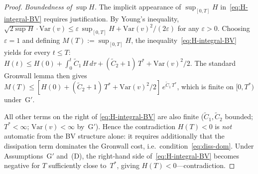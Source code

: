 \documentclass[12pt,a4paper]{article}
\theoremstyle{definition}
\theoremstyle{plain}
\theoremstyle{remark}
\begin{document}
\begin{proof}
\emph{Boundedness of $\sup H$.}\;
The implicit appearance of $\sup_{[0,T]} H$ in~\eqref{eq:H-integral-BV}
requires justification.  By Young's inequality,
$\sqrt{2\sup H}\cdot\mathrm{Var}(v)
\le \varepsilon\,\sup_{[0,T]} H + \mathrm{Var}(v)^2/(2\varepsilon)$
for any $\varepsilon > 0$.
Choosing $\varepsilon = 1$ and defining $M(T) := \sup_{[0,T]} H$,
the inequality~\eqref{eq:H-integral-BV} yields for every $t \le T$:
$H(t) \le H(0) + \int_0^t \widetilde{C}_1\,H\,d\tau
+ (\widetilde{C}_2+1)\,T^* + \mathrm{Var}(v)^2/2$.
The standard Gronwall lemma then gives
$M(T) \le [H(0) + (\widetilde{C}_2+1)\,T^*
+ \mathrm{Var}(v)^2/2]\,e^{\widetilde{C}_1\,T^*}$,
which is finite on $[0,T^*)$ under~G$'$.

All other terms on the right
of \eqref{eq:H-integral-BV} are also finite
($\widetilde{C}_1, \widetilde{C}_2$ bounded;
$T^* < \infty$; $\mathrm{Var}(v) < \infty$ by~G$'$).
Hence the contradiction $H(T) < 0$ is \emph{not} automatic from the
BV structure alone: it requires additionally that the dissipation
term dominates the Gronwall cost, i.e.\ condition~\eqref{eq:diss-dom}.
Under Assumptions~G$'$ and~(D), the right-hand side
of~\eqref{eq:H-integral-BV} becomes negative for $T$ sufficiently
close to~$T^*$, giving $H(T) < 0$---contradiction.
\end{proof}
\end{document}
